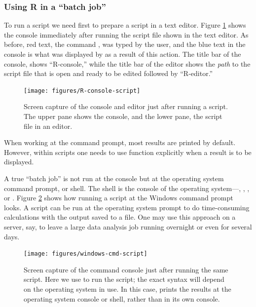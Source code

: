 \documentclass[krantz2]{krantz}\usepackage{knitr}
\begin{document}
\subsubsection{Using R in a ``batch job''}

To run a script we need first to prepare a script in a text editor. Figure \ref{fig:intro:script} shows the console immediately after running the script file shown in the text editor. As before, red text, the command , was typed by the user, and the blue text in the console is what was displayed by \Rpgrm as a result of this action. The title bar of the console, shows ``R-console,'' while the title bar of the editor shows the \emph{path} to the script file that is open and ready to be edited followed by ``R-editor.''

\begin{figure}
  \centering
  \texttt{[image: figures/R-console-script]}
  \caption[Script sourced at the R console]{Screen capture of the \Rpgrm console and editor just after running a script. The upper pane shows the \Rpgrm console, and the lower pane, the script file in an editor. }\label{fig:intro:script}
\end{figure}

\begin{warningbox}
When working at the command prompt, most results are printed by default. However, within scripts one needs to use function  explicitly when a result is to be displayed.
\end{warningbox}

A true ``batch job'' is not run at the \Rpgrm console but at the operating system command prompt, or shell. The shell is the console of the operating system---, , , or . Figure \ref{fig:intro:shell} shows how running a script at the Windows command prompt looks. A script can be run at the operating system prompt to do time-consuming calculations with the output saved to a file. One may use this approach on a server, say, to leave a large data analysis job running overnight or even for several days.

\begin{figure}
  \centering
  \texttt{[image: figures/windows-cmd-script]}
  \caption[Script at the Windows cmd promt]{Screen capture of the  command console just after running the same script. Here we use  to run the script; the exact syntax will depend on the operating system in use. In this case, \Rpgrm prints the results at the operating system console or shell, rather than in its own \Rpgrm console.}\label{fig:intro:shell}
\end{figure}
\end{document}
